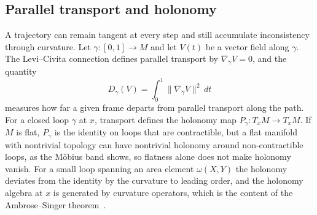 \documentclass[11pt,a4paper]{article}
\theoremstyle{definition}
\theoremstyle{remark}
\newcommand{\TM}[1]{T_{#1}M}
\begin{document}
\subsection{Parallel transport and holonomy}

A trajectory can remain tangent at every step and still accumulate
inconsistency through curvature. Let $\gamma:[0,1]\to M$ and let $V(t)$ be a
vector field along $\gamma$. The Levi--Civita connection defines parallel
transport by $\nabla_{\dot\gamma}V=0$, and the quantity
\[
D_\gamma(V)=\int_0^1\|\nabla_{\dot\gamma}V\|^2\,dt
\]
measures how far a given frame departs from parallel transport along the
path. For a closed loop $\gamma$ at $x$, transport defines the holonomy map
$P_\gamma:\TM{x}\to\TM{x}$. If $M$ is flat, $P_\gamma$ is the identity on
loops that are contractible, but a flat manifold with nontrivial topology
can have nontrivial holonomy around non-contractible loops, as the M\"obius
band shows, so flatness alone does not make holonomy vanish. For a small loop
spanning an area element $\omega(X,Y)$ the holonomy deviates from the
identity by the curvature to leading order, and the holonomy algebra at $x$
is generated by curvature operators, which is the content of the
Ambrose--Singer theorem~\cite{ambrose1953holonomy}.
\end{document}
